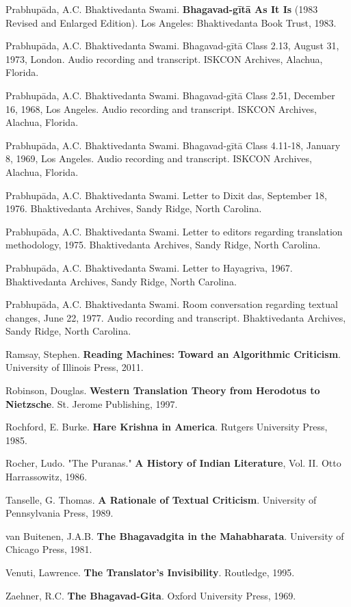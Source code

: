 \documentclass[11pt,twoside]{book}
\begin{document}
Prabhupāda, A.C. Bhaktivedanta Swami. \textbf{Bhagavad-gītā As It Is} (1983 Revised and Enlarged Edition). Los Angeles: Bhaktivedanta Book Trust, 1983.

Prabhupāda, A.C. Bhaktivedanta Swami. Bhagavad-gītā Class 2.13, August 31, 1973, London. Audio recording and transcript. ISKCON Archives, Alachua, Florida.

Prabhupāda, A.C. Bhaktivedanta Swami. Bhagavad-gītā Class 2.51, December 16, 1968, Los Angeles. Audio recording and transcript. ISKCON Archives, Alachua, Florida.

Prabhupāda, A.C. Bhaktivedanta Swami. Bhagavad-gītā Class 4.11-18, January 8, 1969, Los Angeles. Audio recording and transcript. ISKCON Archives, Alachua, Florida.

Prabhupāda, A.C. Bhaktivedanta Swami. Letter to Dixit das, September 18, 1976. Bhaktivedanta Archives, Sandy Ridge, North Carolina.

Prabhupāda, A.C. Bhaktivedanta Swami. Letter to editors regarding translation methodology, 1975. Bhaktivedanta Archives, Sandy Ridge, North Carolina.

Prabhupāda, A.C. Bhaktivedanta Swami. Letter to Hayagriva, 1967. Bhaktivedanta Archives, Sandy Ridge, North Carolina.

Prabhupāda, A.C. Bhaktivedanta Swami. Room conversation regarding textual changes, June 22, 1977. Audio recording and transcript. Bhaktivedanta Archives, Sandy Ridge, North Carolina.

Ramsay, Stephen. \textbf{Reading Machines: Toward an Algorithmic Criticism}. University of Illinois Press, 2011.

Robinson, Douglas. \textbf{Western Translation Theory from Herodotus to Nietzsche}. St. Jerome Publishing, 1997.

Rochford, E. Burke. \textbf{Hare Krishna in America}. Rutgers University Press, 1985.

Rocher, Ludo. "The Puranas." \textbf{A History of Indian Literature}, Vol. II. Otto Harrassowitz, 1986.

Tanselle, G. Thomas. \textbf{A Rationale of Textual Criticism}. University of Pennsylvania Press, 1989.

van Buitenen, J.A.B. \textbf{The Bhagavadgita in the Mahabharata}. University of Chicago Press, 1981.

Venuti, Lawrence. \textbf{The Translator's Invisibility}. Routledge, 1995.

Zaehner, R.C. \textbf{The Bhagavad-Gita}. Oxford University Press, 1969.
\end{document}
